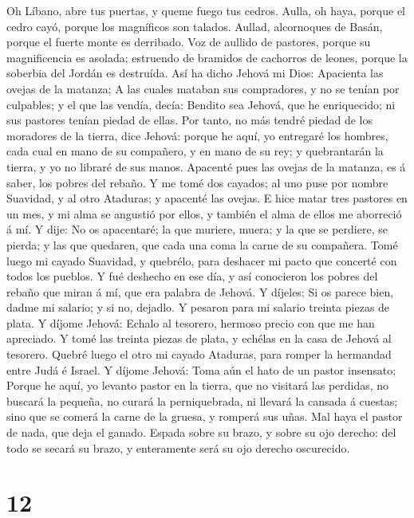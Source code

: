  Oh Líbano, abre tus puertas, y queme fuego tus cedros.
 Aulla, oh haya, porque el cedro cayó, porque los
magníficos son talados. Aullad, alcornoques de Basán, porque el fuerte
monte es derribado.  Voz de aullido de pastores, porque su
magnificencia es asolada; estruendo de bramidos de cachorros de leones,
porque la soberbia del Jordán es destruída.  Así ha dicho
Jehová mi Dios: Apacienta las ovejas de la matanza;  A las
cuales mataban sus compradores, y no se tenían por culpables; y el que
las vendía, decía: Bendito sea Jehová, que he enriquecido; ni sus
pastores tenían piedad de ellas.  Por tanto, no más tendré
piedad de los moradores de la tierra, dice Jehová: porque he aquí, yo
entregaré los hombres, cada cual en mano de su compañero, y en mano de
su rey; y quebrantarán la tierra, y yo no libraré de sus manos.
 Apacenté pues las ovejas de la matanza, es á saber, los
pobres del rebaño. Y me tomé dos cayados; al uno puse por nombre
Suavidad, y al otro Ataduras; y apacenté las ovejas.  E
hice matar tres pastores en un mes, y mi alma se angustió por ellos, y
también el alma de ellos me aborreció á mí.  Y dije: No os
apacentaré; la que muriere, muera; y la que se perdiere, se pierda; y
las que quedaren, que cada una coma la carne de su compañera.
 Tomé luego mi cayado Suavidad, y quebrélo, para deshacer
mi pacto que concerté con todos los pueblos.  Y fué
deshecho en ese día, y así conocieron los pobres del rebaño que miran á
mí, que era palabra de Jehová.  Y díjeles: Si os parece
bien, dadme mi salario; y si no, dejadlo. Y pesaron para mi salario
treinta piezas de plata.  Y díjome Jehová: Echalo al
tesorero, hermoso precio con que me han apreciado. Y tomé las treinta
piezas de plata, y echélas en la casa de Jehová al tesorero.
 Quebré luego el otro mi cayado Ataduras, para romper la
hermandad entre Judá é Israel.  Y díjome Jehová: Toma aún
el hato de un pastor insensato;  Porque he aquí, yo
levanto pastor en la tierra, que no visitará las perdidas, no buscará la
pequeña, no curará la perniquebrada, ni llevará la cansada á cuestas;
sino que se comerá la carne de la gruesa, y romperá sus uñas.
 Mal haya el pastor de nada, que deja el ganado. Espada
sobre su brazo, y sobre su ojo derecho: del todo se secará su brazo, y
enteramente será su ojo derecho oscurecido.

\hypertarget{section-11}{%
\section{12}\label{section-11}}


